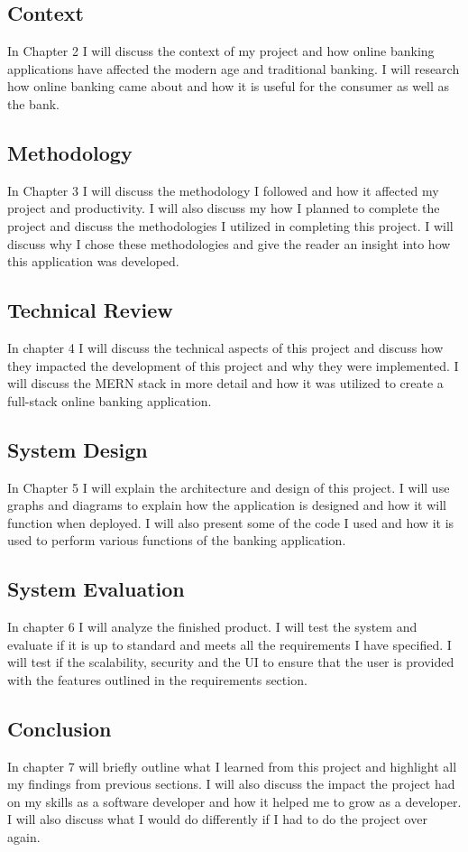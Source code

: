 \subsection{Context}
In Chapter 2 I will discuss the context of my project and how online banking applications
have affected the modern age and traditional banking.  I will research how
online banking came about and how it is useful for the consumer as well as the
bank.
\subsection{Methodology}
In Chapter 3 I will discuss the methodology I followed and how it affected my
project and productivity.  I will also discuss my how I planned to complete the
project and discuss the methodologies I utilized in completing this project. I
will discuss why I chose these methodologies and give the reader an insight into
how this application was developed.
\subsection{Technical Review}
In chapter 4 I will discuss the technical aspects of this project and discuss how
they impacted the development of this project and why they were implemented. I
will discuss the MERN stack in more detail and how it was utilized to create a
full-stack online banking application.
\subsection{System Design}
In Chapter 5 I will explain the architecture and design of this project. I will
use graphs and diagrams to explain how the application is designed and how it will
function when deployed.  I will also present some of the code I used and how it
is used to perform various functions of the banking application.
\subsection{System Evaluation}
In chapter 6 I will analyze the finished product. I will test the system and evaluate
if it is up to standard and meets all the requirements I have specified. I will
test if the scalability, security and the UI to ensure that the user is provided
with the features outlined in the requirements section.
\subsection{Conclusion}
In chapter 7 will briefly outline what I learned from this project and highlight all
my findings from previous sections. I will also discuss the impact the project
had on my skills as a software developer and how it helped me to grow as a developer.
I will also discuss what I would do differently if I had to do the project over again.
